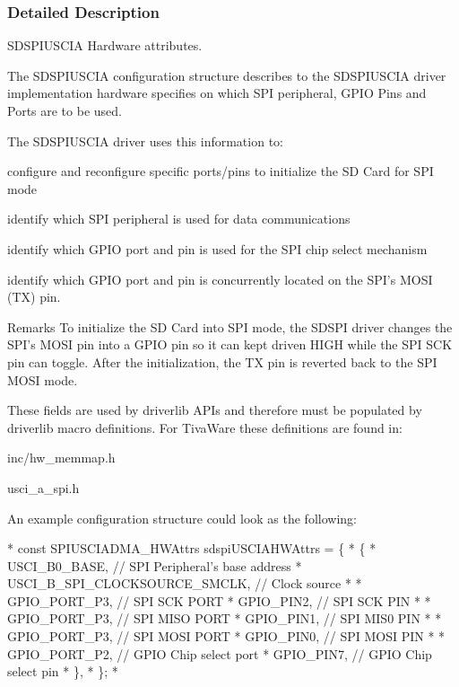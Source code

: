 \subsubsection{Detailed Description}
S\-D\-S\-P\-I\-U\-S\-C\-I\-A Hardware attributes. 

The S\-D\-S\-P\-I\-U\-S\-C\-I\-A configuration structure describes to the S\-D\-S\-P\-I\-U\-S\-C\-I\-A driver implementation hardware specifies on which S\-P\-I peripheral, G\-P\-I\-O Pins and Ports are to be used.

The S\-D\-S\-P\-I\-U\-S\-C\-I\-A driver uses this information to\-:
\begin{DoxyItemize}
\item configure and reconfigure specific ports/pins to initialize the S\-D Card for S\-P\-I mode
\item identify which S\-P\-I peripheral is used for data communications
\item identify which G\-P\-I\-O port and pin is used for the S\-P\-I chip select mechanism
\item identify which G\-P\-I\-O port and pin is concurrently located on the S\-P\-I's M\-O\-S\-I (T\-X) pin.
\end{DoxyItemize}

\begin{DoxyRemark}{Remarks}
To initialize the S\-D Card into S\-P\-I mode, the S\-D\-S\-P\-I driver changes the S\-P\-I's M\-O\-S\-I pin into a G\-P\-I\-O pin so it can kept driven H\-I\-G\-H while the S\-P\-I S\-C\-K pin can toggle. After the initialization, the T\-X pin is reverted back to the S\-P\-I M\-O\-S\-I mode.
\end{DoxyRemark}
These fields are used by driverlib A\-P\-Is and therefore must be populated by driverlib macro definitions. For Tiva\-Ware these definitions are found in\-:
\begin{DoxyItemize}
\item inc/hw\-\_\-memmap.\-h
\item usci\-\_\-a\-\_\-spi.\-h
\end{DoxyItemize}

An example configuration structure could look as the following\-: 
\begin{DoxyCode}
*  \textcolor{keyword}{const} SPIUSCIADMA_HWAttrs sdspiUSCIAHWAttrs = \{
*      \{
*           USCI\_B0\_BASE, \textcolor{comment}{// SPI Peripheral's base address}
*           USCI\_B\_SPI\_CLOCKSOURCE\_SMCLK, \textcolor{comment}{// Clock source}
*
*           GPIO\_PORT\_P3,  \textcolor{comment}{// SPI SCK PORT}
*           GPIO\_PIN2,     \textcolor{comment}{// SPI SCK PIN}
*
*           GPIO\_PORT\_P3,  \textcolor{comment}{// SPI MISO PORT}
*           GPIO\_PIN1,     \textcolor{comment}{// SPI MIS0 PIN}
*
*           GPIO\_PORT\_P3,  \textcolor{comment}{// SPI MOSI PORT}
*           GPIO\_PIN0,     \textcolor{comment}{// SPI MOSI PIN}
*
*           GPIO\_PORT\_P2,  \textcolor{comment}{// GPIO Chip select port}
*           GPIO\_PIN7,     \textcolor{comment}{// GPIO Chip select pin}
*       \},
*  \};
*  
\end{DoxyCode}
 

